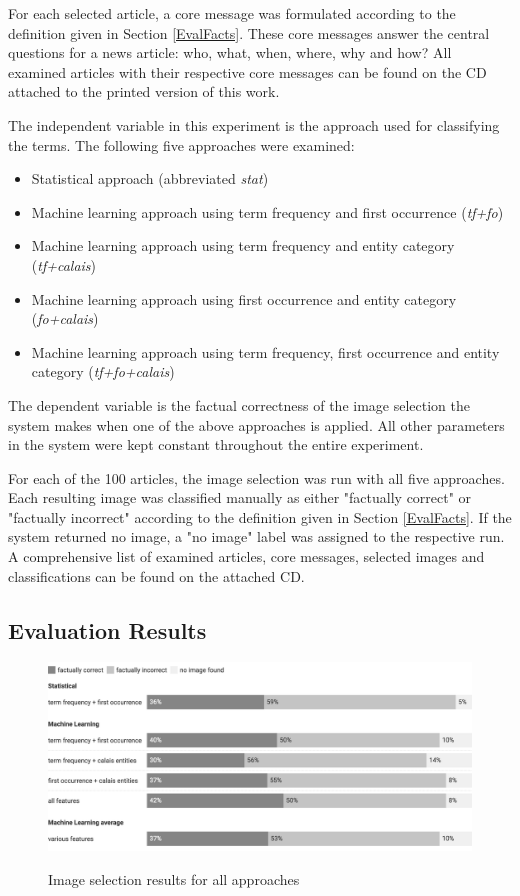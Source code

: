 \documentclass[11pt,a4paper,twoside]{article}
\begin{document}
\noindent For each selected article, a core message was formulated according to the definition given in Section \ref{EvalFacts}. These core messages answer the central questions for a news article: who, what, when, where, why and how? All examined articles with their respective core messages can be found on the CD attached to the printed version of this work.

The independent variable in this experiment is the approach used for classifying the terms. The following five approaches were examined:

\begin{itemize}
    \setlength\itemsep{0em}
    \item Statistical approach (abbreviated \emph{stat})
    \item Machine learning approach using term frequency and first occurrence (\emph{tf+fo})
    \item Machine learning approach using term frequency and entity category (\emph{tf+calais})
    \item Machine learning approach using first occurrence and entity category (\emph{fo+calais})
    \item Machine learning approach using term frequency, first occurrence and entity category (\emph{tf+fo+calais})
\end{itemize}

\noindent The dependent variable is the factual correctness of the image selection the system makes when one of the above approaches is applied. All other parameters in the system were kept constant throughout the entire experiment.

For each of the 100 articles, the image selection was run with all five approaches. Each resulting image was classified manually as either "factually correct" or "factually incorrect" according to the definition given in Section \ref{EvalFacts}. If the system returned no image, a "no image" label was assigned to the respective run. A comprehensive list of examined articles, core messages, selected images and classifications can be found on the attached CD.

\subsection{Evaluation Results} \label{EvalResults}

\begin{figure}[t]
    \caption{Image selection results for all approaches}
    \centering
    \includegraphics[width=\columnwidth]{fig-results-overview.png}
    \label{fig:results-overview}
\end{figure}
\end{document}
